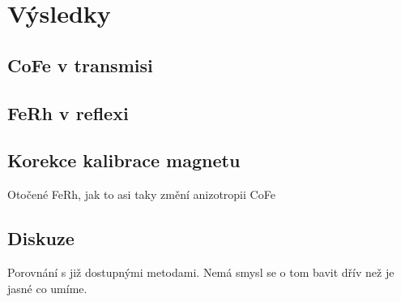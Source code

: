 \chapter{Výsledky} \label{k:vysledky}

\section{CoFe v transmisi}

\section{FeRh v reflexi}

\section{Korekce kalibrace magnetu}

Otočené FeRh, jak to asi taky změní anizotropii CoFe

\section{Diskuze}

Porovnání s již dostupnými metodami.
Nemá smysl se o tom bavit dřív než je jasné co umíme.